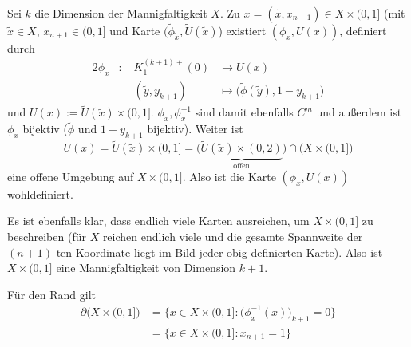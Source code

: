 \documentclass[a4paper]{scrartcl}
\begin{document}
	\setcounter{section}{11}

	\begin{aufgabe}~
		
		Sei $k$ die Dimension der Mannigfaltigkeit $X$.
		Zu $x = (\tilde x, x_{n+1}) \in X \times (0,1]$ (mit $\tilde x \in X$, $x_{n+1} \in (0,1]$ und Karte $(\tilde\phi_{\tilde x}, \tilde U(\tilde x)$) existiert $(\phi_x, U(x))$, definiert durch
		\begin{alignat*}{2}
			\phi_x &:\; &K_1^{(k+1)+}(0) &\to U(x) \\
			 &&(\tilde y, y_{k+1}) &\mapsto \big( \tilde \phi(\tilde y), 1-y_{k+1} \big)
		\end{alignat*}
		und $U(x) := \tilde U(\tilde x) \times (0,1]$.
		$\phi_x, \phi_x^{-1}$ sind damit ebenfalls $C^m$ und außerdem ist $\phi_x$ bijektiv ($\tilde \phi$ und $1-y_{k+1}$ bijektiv).
		Weiter ist 
		\[
			U(x) = \tilde U(\tilde x) \times (0,1] = \big(\underbrace{\tilde U(\tilde x) \times (0,2)}_{\text{offen}} \big) \cap \big(X \times (0,1]\big)
		\]
		eine offene Umgebung auf $X \times (0,1]$.
		Also ist die Karte $(\phi_x, U(x))$ wohldefiniert. 
		
		Es ist ebenfalls klar, dass endlich viele Karten ausreichen, um $X \times (0,1]$ zu beschreiben (für $X$ reichen endlich viele und die gesamte Spannweite der $(n+1)$-ten Koordinate liegt im Bild jeder obig definierten Karte).
		Also ist $X\times (0,1]$ eine Mannigfaltigkeit von Dimension $k+1$.

		Für den Rand gilt
		\begin{align*}
			\partial \big(X \times (0,1] \big) &= \Big\{ x \in X\times (0,1] : \big( \phi_x^{-1}(x) \big)_{k+1} = 0 \Big\} \\
			&= \Big\{ x \in X\times(0,1] : x_{n+1} = 1 \Big\}
		\end{align*}
	\end{aufgabe}
\end{document}
